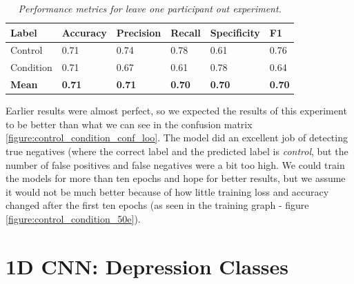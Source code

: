 \begin{table}[h]
\begin{center}
      \begin{tabular}{|l|l|l|l|l|l|}
            \hline
            \bfseries Label & \bfseries Accuracy & \bfseries Precision & \bfseries Recall & \bfseries Specificity & \bfseries F1 \\\hline
            Control & 0.71 & 0.74 & 0.78 & 0.61 & 0.76 \\\hline
            Condition & 0.71 & 0.67 & 0.61 & 0.78 & 0.64 \\\hline
            \bfseries Mean & \bfseries 0.71 & \bfseries 0.71 & \bfseries 0.70 & \bfseries 0.70 & \bfseries 0.70 \\\hline
      \end{tabular}
      \caption{\textit{Performance metrics for leave one participant out experiment.}}
      \label{table:control_condition_performance_loo}
\end{center}
\end{table}

Earlier results were almost perfect, so we expected the results of this experiment to be better than what we can see in the confusion matrix \ref{figure:control_condition_conf_loo}. The model did an excellent job of detecting true negatives (where the correct label and the predicted label is \textit{control}, but the number of false positives and false negatives were a bit too high. We could train the models for more than ten epochs and hope for better results, but we assume it would not be much better because of how little training loss and accuracy changed after the first ten epochs (as seen in the training graph - figure \ref{figure:control_condition_50e}). 

\section{1D CNN: Depression Classes}

